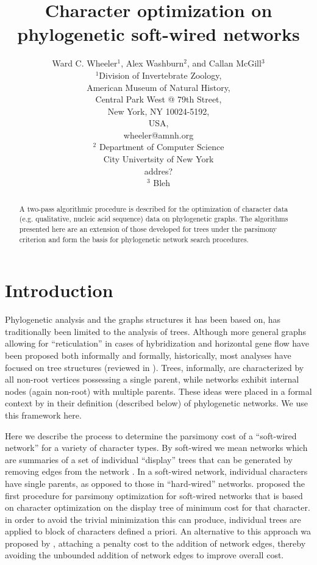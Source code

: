 \documentclass[12pt]{article}
\title{Character optimization on phylogenetic soft-wired networks}
\author{Ward C. Wheeler$^1$, Alex Washburn$^2$, and Callan McGill$^3$\\
		$^1$Division of Invertebrate Zoology,\\
		American Museum of Natural History,\\
		Central Park West @ 79th Street,\\
		New York, NY 10024-5192,\\
		USA,\\
		wheeler@amnh.org\\
	    $^2$ Department of Computer Science\\
        City Univertsity of New York\\
        addres?\\
        $^3$ Bleh}
\begin{document}
\maketitle
\newpage
\doublespace
\begin{abstract}
	A two-pass algorithmic procedure is described for the optimization of character data (e.g. qualitative, nucleic acid sequence) data
	on phylogenetic graphs.  The algorithms presented here are an extension of those developed for trees under the parsimony criterion
	and form the basis for phylogenetic network search procedures. 
\end{abstract}
\newpage
\tableofcontents
\newpage

\section{Introduction} \label{Introduction}
Phylogenetic analysis and the graphs structures it has been based on, has traditionally been limited to the analysis of trees.  Although more general
graphs allowing for ``reticulation'' in cases of hybridization and horizontal gene flow have been proposed both informally and formally, 
historically, most analyses have focused on tree structures (reviewed in \citealp{Wheeler2012}).  Trees, informally, are characterized by all non-root vertices
possessing a single parent, while networks exhibit internal nodes (again non-root) with multiple parents.  These ideas were placed in a formal context 
by \cite{moretetal2004} in their definition (described below) of phylogenetic networks.  We use this framework here.

Here we describe the process to determine the parsimony cost of a ``soft-wired network'' for a variety of character types.  By soft-wired we 
mean networks which are summaries of a set of individual ``display'' trees that can be generated by removing edges 
from the network \citep{Nakhlehetal2005, KannanandWheeler2012, Fischeretal2013}. In a soft-wired network, individual characters
have single parents, as opposed to those in ``hard-wired'' networks.  \cite{Nakhlehetal2005} proposed the first procedure for parsimony optimization
for soft-wired networks that is based on character optimization on the display tree of minimum cost for that character.  in 
order to avoid the trivial minimization this can produce, individual trees are applied to block of characters defined a priori.
An alternative to this approach wa proposed by \cite{Wheeler2015}, attaching a penalty cost to the addition of network edges, thereby
avoiding the unbounded addition of network edges to improve overall cost.
\end{document}
